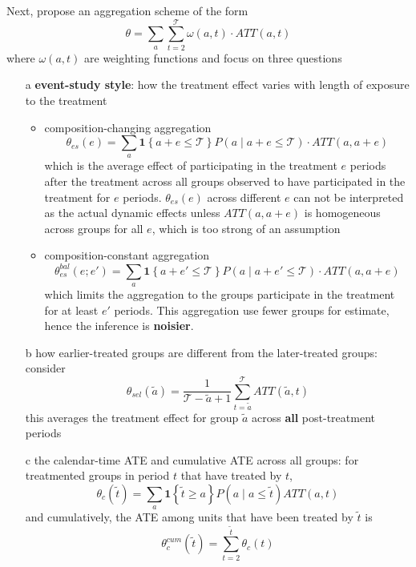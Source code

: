 \documentclass[twoside]{article}
\begin{document}
Next, \citet{callaway2021difference} propose an aggregation scheme of the form $$ \theta = \sum_{a}\sum^{\mathcal{T}}_{t=2}\omega(a,t)\cdot ATT(a,t) $$
where $\omega(a,t)$ are weighting functions and focus on three questions
\begin{itemize}
    \item[a] \textbf{event-study style}: how the treatment effect varies with length of exposure to the treatment 
    \begin{itemize}
        \item composition-changing aggregation $$ \theta_{es}(e) = \sum_{a}\mathbf{1}\left\{a+e\leq \mathcal{T}\right\} P\left(a\mid a+e\leq \mathcal{T}\right)\cdot ATT(a,a+e) $$ which is the average effect of participating in the treatment $e$ periods after the treatment across all groups observed to have participated in the treatment for $e$ periods. $\theta_{es}(e)$ across different $e$ can not be interpreted as the actual dynamic effects unless $ATT(a,a+e)$ is homogeneous across groups for all $e$, which is too strong of an assumption
        \item composition-constant aggregation $$ \theta_{es}^{bal}(e;e') = \sum_a \mathbf{1}\left\{a+e'\leq \mathcal{T}\right\}P\left(a\mid a+e'\leq \mathcal{T}\right)\cdot ATT(a,a+e) $$ which limits the aggregation to the groups participate in the treatment for at least $e'$ periods. This aggregation use fewer groups for estimate, hence the inference is \textbf{noisier}.
    \end{itemize}
    \item[b] how earlier-treated groups are different from the later-treated groups: consider $$ \theta_{sel}\left(\tilde{a}\right) = \frac{1}{\mathcal{T}-\tilde{a}+1} \sum^{\mathcal{T}}_{t=\tilde{a}} ATT\left(\tilde{a},t\right) $$ this averages the treatment effect for group $\tilde{a}$ across \textbf{all} post-treatment periods
    \item[c] the calendar-time ATE and cumulative ATE across all groups: for treatmented groups in period $t$ that have treated by $t$, $$ \theta_c\left(\tilde{t}\right) = \sum_{a}\mathbf{1}\left\{\tilde{t}\geq a\right\} P\left(a\mid a\leq \tilde{t}\right) ATT\left(a,t\right)$$
    and cumulatively, the ATE among units that have been treated by $\tilde{t}$ is $$ \theta_c^{cum}\left(\tilde{t}\right) =\sum^{\tilde{t}}_{t=2}\theta_c (t) $$
\end{itemize}
\end{document}
